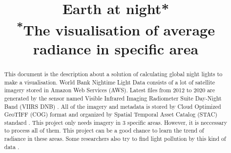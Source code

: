 \documentclass[conference]{IEEEtran}
\begin{document}
 
 
  
\title{Earth at night*\\
{\footnotesize \textsuperscript{*}The visualisation of average radiance in specific area}
}
 
\author{
\and
{}
\and
{}
\and
{}
\and
{}
}  

\maketitle

\begin{abstract}

This document is the description about a solution of calculating global night lights to make a visualisation. World Bank Nightime Light Data consists of a lot of satellite imagery 
stored in Amazon Web Services (AWS). Latest files from 2012 to 2020 are generated by the sensor 
named Visible Infrared Imaging Radiometer Suite Day-Night Band (VIIRS DNB) \cite{WorldBan13:online}. All of the imagery and metadata is  
stored by Cloud Optimized GeoTIFF (COG) \cite{CloudOpt5:online} format and organized by Spatial Temporal Asset Catalog (STAC) standard \cite{SpatioTe90:online}. 
This project only needs imagery in 3 specific areas. However, it is neccessary to process all of them. 
This project can be a good chance to learn the trend of radiance in these areas. Some researchers also try to find light pollution by this kind of data \cite{BARA2020106658}. 

\end{abstract}
\end{document}
